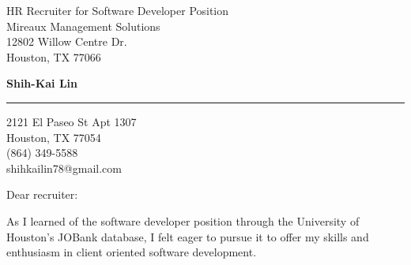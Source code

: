 \documentclass{letter} %
\begin{document}
\signature{Shih-Kai Lin}           %
\longindentation=0pt                       %
\let\raggedleft\raggedright                %
 
 
\begin{letter}{HR Recruiter for Software Developer Position \\
Mireaux Management Solutions \\
12802 Willow Centre Dr. \\
Houston, TX 77066}

\begin{center}
{\large\bf Shih-Kai Lin} 
\end{center}
\medskip\hrule height 1pt
\begin{center}
{2121 El Paseo St Apt 1307 \\   Houston, TX 77054 \\ (864) 349-5588 \\ shihkailin78@gmail.com} 
\end{center} \vfill %
 
 
\opening{Dear recruiter:} 
 
\noindent %
As I learned of the software developer position through the University of Houston's JOBank database, I felt eager to pursue it to offer my skills and enthusiasm in client oriented software development.
 

\end{letter}
\end{document}
